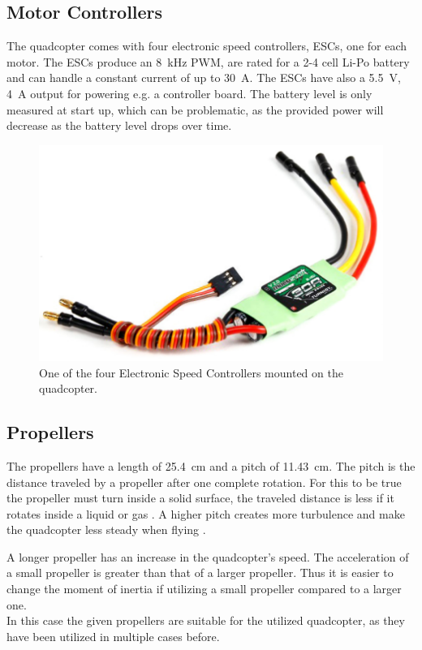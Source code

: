 \subsection{Motor Controllers}\label{subsec:ESC}
The quadcopter comes with four electronic speed controllers, ESCs, one for each motor. The ESCs produce an \SI{8}{kHz} PWM, are rated for a 2-4 cell Li-Po battery and can handle a constant current of up to \SI{30}{A}. The ESCs have also a \SI{5.5}{V}, \SI{4}{A} output for powering e.g. a controller board. The battery level is only measured at start up, which can be problematic, as the provided power will decrease as the battery level drops over time. \cite{HKing}
%
\begin{figure}[H]
	\centering
	\includegraphics[scale=0.6]{figures/MotorControllerPhoto.pdf}
	\caption{One of the four Electronic Speed Controllers mounted on the quadcopter.\cite{HKing}}
	\label{fig:esc}
\end{figure}
%
\subsection{Propellers}
The propellers have a length of \SI{25.4}{cm} and a pitch of \SI{11.43}{cm}. The pitch is the distance traveled by a propeller after one complete rotation. For this to be true the propeller must turn inside a solid surface, the traveled distance is less if it rotates inside a liquid or gas \cite{EReyes}. A higher pitch creates more turbulence and make the quadcopter less steady when flying \cite{oscarliang}.

A longer propeller has an increase in the quadcopter's speed. The acceleration of a small propeller is greater than that of a larger propeller. Thus it is easier to change the moment of inertia if utilizing a small propeller compared to a larger one. \cite{oscarliang}\\
In this case the given propellers are suitable for the utilized quadcopter, as they have been utilized in multiple cases before. 

